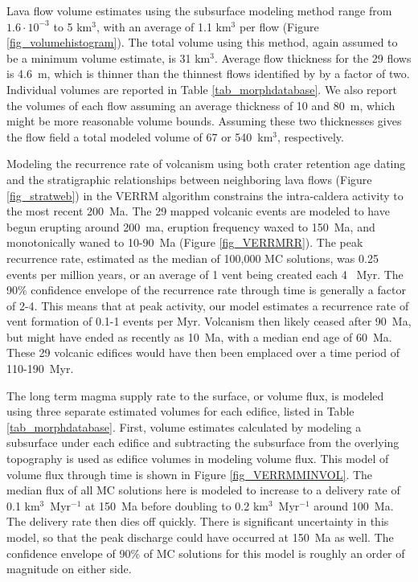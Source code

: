 \documentclass[12pt,letter]{article}
\begin{document}
Lava flow volume estimates using the subsurface modeling method range from $1.6\cdot 10^{-3}$ to 5 km$^3$, with an average of 1.1 km$^3$ per flow (Figure \ref{fig_volumehistogram}). The total volume using this method, again assumed to be a minimum volume estimate, is 31 km$^3$. Average flow thickness for the 29 flows is 4.6~m, which is thinner than the thinnest flows identified by \citet{mouginis2008lava} by a factor of two. Individual volumes are reported in Table \ref{tab_morphdatabase}. We also report the volumes of each flow assuming an average thickness of 10 and 80~m, which might be more reasonable volume bounds. Assuming these two thicknesses gives the flow field a total modeled volume of 67 or 540~km$^3$, respectively.

Modeling the recurrence rate of volcanism using both crater retention age dating and the stratigraphic relationships between neighboring lava flows (Figure \ref{fig_stratweb}) in the VERRM algorithm constrains the intra-caldera activity to the most recent 200~Ma. The 29 mapped volcanic events are modeled to have begun erupting around 200~ma, eruption frequency waxed to 150~Ma, and monotonically waned to 10-90~Ma (Figure \ref{fig_VERRMRR}). The peak recurrence rate, estimated as the median of 100,000 MC solutions, was 0.25 events per million years, or an average of 1 vent being created each 4 ~Myr. The 90\% confidence envelope of the recurrence rate through time is generally a factor of 2-4. This means that at peak activity, our model estimates a recurrence rate of vent formation of 0.1-1 events per Myr. Volcanism then likely ceased after 90~Ma, but might have ended as recently as 10~Ma, with a median end age of 60~Ma. These 29 volcanic edifices would have then been emplaced over a time period of 110-190~Myr.

The long term magma supply rate to the surface, or volume flux, is modeled using three separate estimated volumes for each edifice, listed in Table \ref{tab_morphdatabase}. First, volume estimates calculated by modeling a subsurface under each edifice and subtracting the subsurface from the overlying topography is used as edifice volumes in modeling volume flux. This model of volume flux through time is shown in Figure \ref{fig_VERRMMINVOL}. The median flux of all MC solutions here is modeled to increase to a delivery rate of 0.1 km$^3$~Myr$^{-1}$ at 150~Ma before doubling to 0.2 km$^3$~Myr$^{-1}$ around 100~Ma. The delivery rate then dies off quickly. There is significant uncertainty in this model, so that the peak discharge could have occurred at 150~Ma as well. The confidence envelope of 90\% of MC solutions for this model is roughly an order of magnitude on either side.
\end{document}
